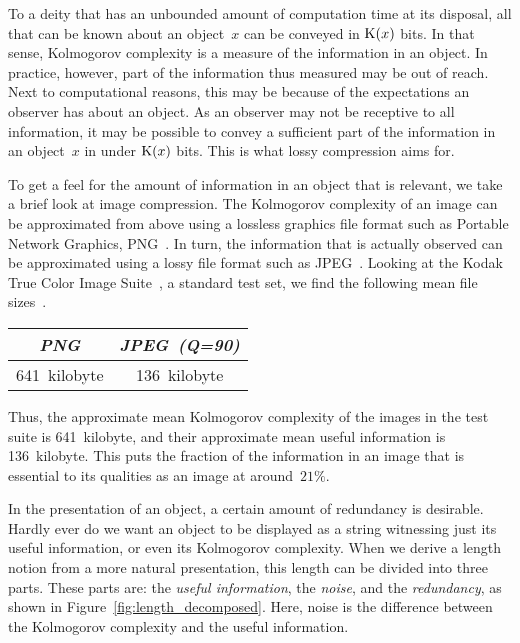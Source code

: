 \label{sec:statistics}%

To a deity that has an unbounded amount of computation time at its disposal, all that can be known about an object~$x$ can be conveyed in $\operatorname{K}(x)$ bits.
In that sense, Kolmogorov complexity is a measure of the information in an object.
In practice, however, part of the information thus measured may be out of reach.
Next to computational reasons, this may be because of the expectations an observer has about an object.
As an observer may not be receptive to all information, it may be possible to convey a sufficient part of the information in an object~$x$ in under $\operatorname{K}(x)$ bits.
This is what lossy compression aims for.

\begin{example}
\label{ex:useful_information}%
  To get a feel for the amount of information in an object that is relevant, we take a brief look at image compression.
  The Kolmogorov complexity of an image can be approximated from above using a lossless graphics file format such as Portable Network Graphics, PNG~\parencite{sayood2017introduction}.
  In turn, the information that is actually observed can be approximated using a lossy file format such as JPEG~\parencite{sayood2017introduction}.
  Looking at the Kodak True Color Image Suite~\parencite{franzen1999kodak}, a standard test set, we find the following mean file sizes~\parencite{sneyers2016flif}.
  \begin{center}
    \begin{tabular}{cc}
    \emph{PNG}	& \emph{JPEG~(Q=90)} \\
    \hline
    641~kilobyte	& 136~kilobyte
    \end{tabular}
  \end{center}
  Thus, the approximate mean Kolmogorov complexity of the images in the test suite is 641~kilobyte, and their approximate mean useful information is 136~kilobyte.
  This puts the fraction of the information in an image that is essential to its qualities as an image at around~$21\%$.
\end{example}

In the presentation of an object, a certain amount of redundancy is desirable.
Hardly ever do we want an object to be displayed as a string witnessing just its useful information, or even its Kolmogorov complexity.
When we derive a length notion from a more natural presentation, this length can be divided into three parts.
These parts are: the \emph{useful information}, the \emph{noise}, and the \emph{redundancy}, as shown in Figure~\ref{fig:length_decomposed}.
Here, noise is the difference between the Kolmogorov complexity and the useful information.

